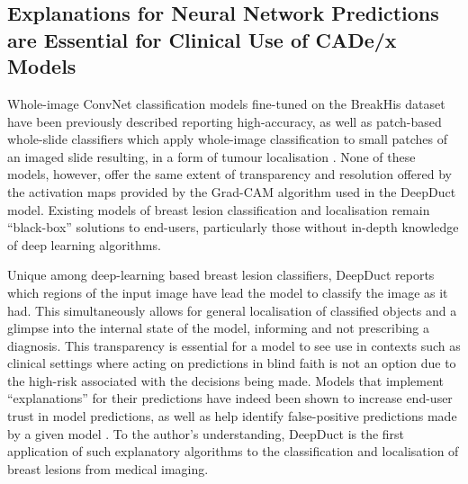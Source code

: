 \subsection{Explanations for Neural Network Predictions are Essential for Clinical Use of CADe/x Models}

Whole-image ConvNet classification models fine-tuned on the BreakHis dataset have been previously described reporting high-accuracy, as well as patch-based whole-slide classifiers which apply whole-image classification to small patches of an imaged slide resulting, in a form of tumour localisation \citep{han2017, wang2016}. None of these models, however, offer the same extent of transparency and resolution offered by the activation maps provided by the Grad-CAM algorithm used in the DeepDuct model. Existing models of breast lesion classification and localisation remain ``black-box'' solutions to end-users, particularly those without in-depth knowledge of deep learning algorithms.\par

Unique among deep-learning based breast lesion classifiers, DeepDuct reports which regions of the input image have lead the model to classify the image as it had. This simultaneously allows for general localisation of classified objects and a glimpse into the internal state of the model, informing and not prescribing a diagnosis. This transparency is essential for a model to see use in contexts such as clinical settings where acting on predictions in blind faith is not an option due to the high-risk associated with the decisions being made. Models that implement ``explanations'' for their predictions have indeed been shown to increase end-user trust in model predictions, as well as help identify false-positive predictions made by a given model \citep{ribeiro2016}. To the author's understanding, DeepDuct is the first application of such explanatory algorithms to the classification and localisation of breast lesions from medical imaging.\par

